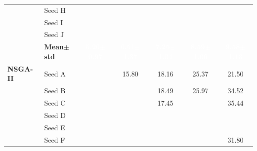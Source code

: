 \begin{table}[H]
{\begin{tabular}{@{}llccccc@{}}
  & Seed H & \cellcolor{RoyalBlue!10}{\small 5.30} & \cellcolor{RoyalBlue!10}{\small 7.72} & \cellcolor{RoyalBlue!10}{\small 7.23} & \cellcolor{RoyalBlue!10}{\small 8.87} & \cellcolor{RoyalBlue!10}{\small 10.33} \\
  & Seed I & \cellcolor{RoyalBlue!10}{\small 5.62} & \cellcolor{RoyalBlue!10}{\small 6.51} & \cellcolor{RoyalBlue!10}{\small 8.28} & \cellcolor{RoyalBlue!10}{\small 9.22} & \cellcolor{RoyalBlue!10}{\small 10.49} \\
  & Seed J & \cellcolor{RoyalBlue!10}{\small 5.77} & \cellcolor{RoyalBlue!10}{\small 7.20} & \cellcolor{RoyalBlue!10}{\small 7.51} & \cellcolor{RoyalBlue!10}{\small 9.02} & \cellcolor{RoyalBlue!10}{\small 9.10} \\
 & \textbf{Mean$\pm$std} & \cellcolor{RoyalBlue!65}\textcolor{white}{\textbf{5.26$\pm$0.97}} & \cellcolor{RoyalBlue!65}\textcolor{white}{\textbf{6.51$\pm$1.37}} & \cellcolor{RoyalBlue!65}\textcolor{white}{\textbf{7.25$\pm$1.04}} & \cellcolor{RoyalBlue!65}\textcolor{white}{\textbf{8.59$\pm$1.06}} & \cellcolor{RoyalBlue!65}\textcolor{white}{\textbf{9.58$\pm$1.13}} \\
\midrule
 \textbf{NSGA-II} & Seed A & \cellcolor{RoyalBlue!10}{\small 10.19} & {\small\color{gray!60!black}15.80} & {\small\color{gray!60!black}18.16} & {\small\color{gray!60!black}25.37} & {\small\color{gray!60!black}21.50} \\
  & Seed B & \cellcolor{RoyalBlue!10}{\small 7.64} & \cellcolor{RoyalBlue!10}{\small 8.77} & {\small\color{gray!60!black}18.49} & {\small\color{gray!60!black}25.97} & {\small\color{gray!60!black}34.52} \\
  & Seed C & \cellcolor{RoyalBlue!10}{\small 7.09} & \cellcolor{RoyalBlue!10}{\small 9.28} & {\small\color{gray!60!black}17.45} & \cellcolor{RoyalBlue!10}{\small 10.65} & {\small\color{gray!60!black}35.44} \\
  & Seed D & \cellcolor{RoyalBlue!10}{\small 4.99} & \cellcolor{RoyalBlue!10}{\small 9.89} & \cellcolor{RoyalBlue!10}{\small 6.02} & \cellcolor{RoyalBlue!10}{\small 6.11} & \cellcolor{RoyalBlue!10}{\small 6.94} \\
  & Seed E & \cellcolor{RoyalBlue!10}{\small 4.85} & \cellcolor{RoyalBlue!10}{\small 9.72} & \cellcolor{RoyalBlue!10}{\small 5.04} & \cellcolor{RoyalBlue!10}{\small 7.79} & \cellcolor{RoyalBlue!10}{\small 8.60} \\
  & Seed F & \cellcolor{RoyalBlue!10}{\small 5.15} & \cellcolor{RoyalBlue!10}{\small 5.70} & \cellcolor{RoyalBlue!10}{\small 5.32} & \cellcolor{RoyalBlue!10}{\small 7.13} & {\small\color{gray!60!black}31.80} \\

\end{tabular}}
\end{table}
